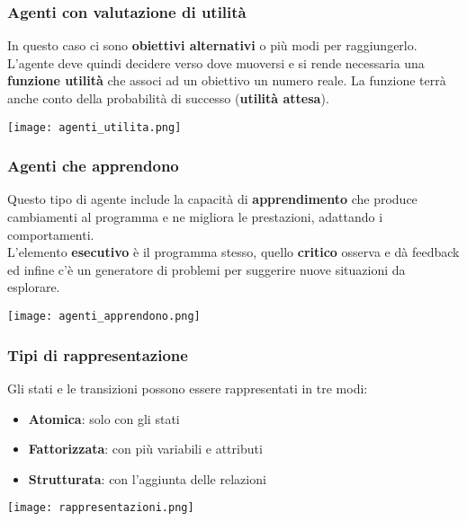 \subsubsection{Agenti con valutazione di utilità}
In questo caso ci sono \textbf{obiettivi alternativi} o più modi per raggiungerlo. L'agente deve quindi decidere verso dove muoversi e si rende necessaria una \textbf{funzione utilità} che associ ad un obiettivo un numero reale. La funzione terrà anche conto della probabilità di successo (\textbf{utilità attesa}).
\begin{center}
	\texttt{[image: agenti\_utilita.png]}
\end{center}

\subsubsection{Agenti che apprendono}
Questo tipo di agente include la capacità di \textbf{apprendimento} che produce cambiamenti al programma e ne migliora le prestazioni, adattando i comportamenti.\\
L'elemento \textbf{esecutivo} è il programma stesso, quello \textbf{critico} osserva e dà feedback ed infine c'è un generatore di problemi per suggerire nuove situazioni da esplorare.
\begin{center}
	\texttt{[image: agenti\_apprendono.png]}
\end{center}

\subsubsection{Tipi di rappresentazione}
Gli stati e le transizioni possono essere rappresentati in tre modi:
\begin{itemize}
	\item \textbf{Atomica}: solo con gli stati
	\item \textbf{Fattorizzata}: con più variabili e attributi
	\item \textbf{Strutturata}: con l'aggiunta delle relazioni
\end{itemize}
\begin{center}
	\texttt{[image: rappresentazioni.png]}
\end{center}